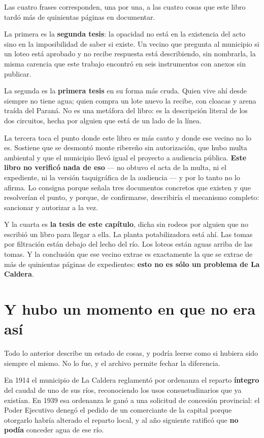 Las cuatro frases corresponden, una por una, a las cuatro cosas que este libro tardó más de quinientas páginas en documentar.

La primera es la \textbf{segunda tesis}: la opacidad no está en la existencia del acto sino
en la imposibilidad de saber si existe. Un vecino que pregunta al municipio si un loteo está
aprobado y no recibe respuesta está describiendo, sin nombrarla, la misma carencia que este
trabajo encontró en seis instrumentos con anexos sin publicar.

La segunda es la \textbf{primera tesis} en su forma más cruda. Quien vive ahí desde siempre
no tiene agua; quien compra un lote nuevo la recibe, con cloacas y arena traída del Paraná.
No es una metáfora del libro: es la descripción literal de los dos circuitos, hecha por
alguien que está de un lado de la línea.

La tercera toca el punto donde este libro es más cauto y donde ese vecino no lo es. Sostiene
que se desmontó monte ribereño sin autorización, que hubo multa ambiental y que el municipio
llevó igual el proyecto a audiencia pública. \textbf{Este libro no verificó nada de eso} ---
no obtuvo el acta de la multa, ni el expediente, ni la versión taquigráfica de la audiencia
--- y por lo tanto no lo afirma. Lo consigna porque señala tres documentos concretos que
existen y que resolverían el punto, y porque, de confirmarse, describiría el mecanismo
completo: sancionar y autorizar a la vez.

Y la cuarta es \textbf{la tesis de este capítulo}, dicha sin rodeos por alguien que no
escribió un libro para llegar a ella. La planta potabilizadora está ahí. Las tomas por
filtración están debajo del lecho del río. Los loteos están aguas arriba de las tomas. Y la
conclusión que ese vecino extrae es exactamente la que se extrae de más de quinientas páginas de expedientes: \textbf{esto no es sólo un problema de La Caldera}.

\section{Y hubo un momento en que no era así}

Todo lo anterior describe un estado de cosas, y podría leerse como si hubiera sido siempre
el mismo. No lo fue, y el archivo permite fechar la diferencia.

En 1914 el municipio de La Caldera reglamentó por ordenanza el reparto \textbf{íntegro} del
caudal de uno de sus ríos, reconociendo los usos consuetudinarios que ya existían. En 1939
esa ordenanza le ganó a una solicitud de concesión provincial: el Poder Ejecutivo denegó el
pedido de un comerciante de la capital porque otorgarlo habría alterado el reparto local, y
al año siguiente ratificó que \textbf{no podía} conceder agua de ese río.

